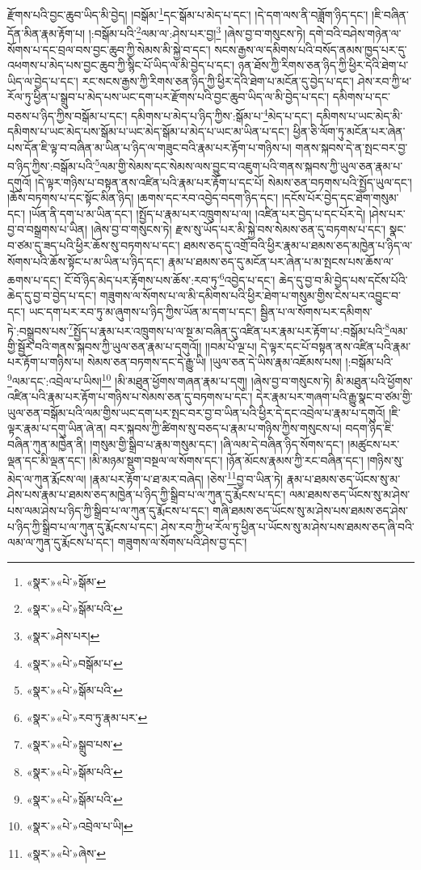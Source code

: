 རྫོགས་པའི་བྱང་ཆུབ་ཡིད་མི་བྱེད། །བསྒོམ་\footnote{«སྣར་»«པེ་»སྒོམ་}དང་སྒོམ་པ་མེད་པ་དང་། །དེ་དག་ལས་ནི་བཟློག་ཉིད་དང་། །ཇི་བཞིན་དོན་མིན་རྣམ་རྟོག་པ། །:བསྒོམ་པའི་\footnote{«སྣར་»«པེ་»སྒོམ་པའི་}ལམ་ལ་:ཤེས་པར་བྱ།\footnote{«སྣར་»ཤེས་པར།} །ཞེས་བྱ་བ་གསུངས་ཏེ། དགེ་བའི་བཤེས་གཉེན་ལ་སོགས་པ་དང་བྲལ་བས་བྱང་ཆུབ་ཀྱི་སེམས་མི་སྐྱེ་བ་དང་། སངས་རྒྱས་ལ་དམིགས་པའི་བསོད་ནམས་ཁྱད་པར་དུ་འཕགས་པ་མེད་པས་བྱང་ཆུབ་ཀྱི་སྙིང་པོ་ཡིད་ལ་མི་བྱེད་པ་དང་། ཉན་ཐོས་ཀྱི་རིགས་ཅན་ཉིད་ཀྱི་ཕྱིར་དེའི་ཐེག་པ་ཡིད་ལ་བྱེད་པ་དང་། རང་སངས་རྒྱས་ཀྱི་རིགས་ཅན་ཉིད་ཀྱི་ཕྱིར་དེའི་ཐེག་པ་མངོན་དུ་བྱེད་པ་དང་། ཤེས་རབ་ཀྱི་ཕ་རོལ་ཏུ་ཕྱིན་པ་སྒྲུབ་པ་མེད་པས་ཡང་དག་པར་རྫོགས་པའི་བྱང་ཆུབ་ཡིད་ལ་མི་བྱེད་པ་དང་། དམིགས་པ་དང་བཅས་པ་ཉིད་ཀྱིས་བསྒོམ་པ་དང་། དམིགས་པ་མེད་པ་ཉིད་ཀྱིས་:སྒོམ་པ་\footnote{«སྣར་»«པེ་»བསྒོམ་པ་}མེད་པ་དང་། དམིགས་པ་ཡང་མེད་མི་དམིགས་པ་ཡང་མེད་པས་སྒོམ་པ་ཡང་མེད་སྒོམ་པ་མེད་པ་ཡང་མ་ཡིན་པ་དང་། ཕྱིན་ཅི་ལོག་ཏུ་མངོན་པར་ཞེན་པས་དོན་ཇི་ལྟ་བ་བཞིན་མ་ཡིན་པ་ཉིད་ལ་གཟུང་བའི་རྣམ་པར་རྟོག་པ་གཉིས་པ། གནས་སྐབས་དེ་ན་སྤང་བར་བྱ་བ་ཉིད་ཀྱིས་:བསྒོམ་པའི་\footnote{«སྣར་»«པེ་»སྒོམ་པའི་}ལམ་གྱི་སེམས་དང་སེམས་ལས་བྱུང་བ་འཇུག་པའི་གནས་སྐབས་ཀྱི་ཡུལ་ཅན་རྣམ་པ་དགུའོ། །དེ་ལྟར་གཉིས་པ་བསྟན་ནས་འཛིན་པའི་རྣམ་པར་རྟོག་པ་དང་པོ། སེམས་ཅན་བཏགས་པའི་སྤྱོད་ཡུལ་དང་། །ཆོས་བཏགས་པ་དང་སྟོང་མིན་ཉིད། །ཆགས་དང་རབ་འབྱེད་བདག་ཉིད་དང་། །དངོས་པོར་བྱེད་དང་ཐེག་གསུམ་དང་། །ཡོན་ནི་དག་པ་མ་ཡིན་དང་། །སྤྱོད་པ་རྣམ་པར་འཁྲུགས་པ་ལ། །འཛིན་པར་བྱེད་པ་དང་པོར་དེ། །ཤེས་པར་བྱ་བ་བསྒྲགས་པ་ཡིན། །ཞེས་བྱ་བ་གསུངས་ཏེ། རྫས་སུ་ཡོད་པར་མི་སྐྱེ་བས་སེམས་ཅན་དུ་བཏགས་པ་དང་། སྣང་བ་ཙམ་དུ་ཟད་པའི་ཕྱིར་ཆོས་སུ་བཏགས་པ་དང་། ཐམས་ཅད་དུ་འགྲོ་བའི་ཕྱིར་རྣམ་པ་ཐམས་ཅད་མཁྱེན་པ་ཉིད་ལ་སོགས་པའི་ཆོས་སྟོང་པ་མ་ཡིན་པ་ཉིད་དང་། རྣམ་པ་ཐམས་ཅད་དུ་མངོན་པར་ཞེན་པ་མ་སྤངས་པས་ཆོས་ལ་ཆགས་པ་དང་། ངོ་བོ་ཉིད་མེད་པར་རྟོགས་པས་ཆོས་:རབ་ཏུ་\footnote{«སྣར་»«པེ་»རབ་ཏུ་རྣམ་པར་}འབྱེད་པ་དང་། ཆེད་དུ་བྱ་བ་མི་བྱེད་པས་དངོས་པོའི་ཆེད་དུ་བྱ་བ་བྱེད་པ་དང་། གཟུགས་ལ་སོགས་པ་ལ་མི་དམིགས་པའི་ཕྱིར་ཐེག་པ་གསུམ་གྱིས་ངེས་པར་འབྱུང་བ་དང་། ཡང་དག་པར་རབ་ཏུ་མ་ཞུགས་པ་ཉིད་ཀྱིས་ཡོན་མ་དག་པ་དང་། སྦྱིན་པ་ལ་སོགས་པར་དམིགས་ཏེ་:བསྒྲུབས་པས་\footnote{«སྣར་»«པེ་»སྒྲུབ་པས་}སྤྱོད་པ་རྣམ་པར་འཁྲུགས་པ་ལ་སྔ་མ་བཞིན་དུ་འཛིན་པར་རྣམ་པར་རྟོག་པ་:བསྒོམ་པའི་\footnote{«སྣར་»«པེ་»སྒོམ་པའི་}ལམ་གྱི་སྦྱོར་བའི་གནས་སྐབས་ཀྱི་ཡུལ་ཅན་རྣམ་པ་དགུའོ།། །།བམ་པོ་ལྔ་པ། དེ་ལྟར་དང་པོ་བསྟན་ནས་འཛིན་པའི་རྣམ་པར་རྟོག་པ་གཉིས་པ། སེམས་ཅན་བཏགས་དང་དེ་རྒྱུ་ཡི། །ཡུལ་ཅན་དེ་ཡིས་རྣམ་འཇོམས་པས། །:བསྒོམ་པའི་\footnote{«སྣར་»«པེ་»སྒོམ་པའི་}ལམ་དང་:འབྲེལ་པ་ཡིས།\footnote{«སྣར་»«པེ་»འབྲེལ་པ་ཡི།} །མི་མཐུན་ཕྱོགས་གཞན་རྣམ་པ་དགུ། །ཞེས་བྱ་བ་གསུངས་ཏེ། མི་མཐུན་པའི་ཕྱོགས་འཛིན་པའི་རྣམ་པར་རྟོག་པ་གཉིས་པ་སེམས་ཅན་དུ་བཏགས་པ་དང་། དེར་རྣམ་པར་གཞག་པའི་རྒྱུ་སྣང་བ་ཙམ་གྱི་ཡུལ་ཅན་བསྒོམ་པའི་ལམ་གྱིས་ཡང་དག་པར་སྤང་བར་བྱ་བ་ཡིན་པའི་ཕྱིར་དེ་དང་འབྲེལ་པ་རྣམ་པ་དགུའོ། །ཇི་ལྟར་རྣམ་པ་དགུ་ཡིན་ཞེ་ན། བར་སྐབས་ཀྱི་ཚིགས་སུ་བཅད་པ་རྣམ་པ་གཉིས་ཀྱིས་གསུངས་པ། བདག་ཉིད་ཇི་བཞིན་ཀུན་མཁྱེན་ནི། །གསུམ་གྱི་སྒྲིབ་པ་རྣམ་གསུམ་དང་། །ཞི་ལམ་དེ་བཞིན་ཉིད་སོགས་དང་། །མཚུངས་པར་ལྡན་དང་མི་ལྡན་དང་། །མི་མཉམ་སྡུག་བསྔལ་ལ་སོགས་དང་། །ཉོན་མོངས་རྣམས་ཀྱི་རང་བཞིན་དང་། །གཉིས་སུ་མེད་ལ་ཀུན་རྨོངས་ལ། །རྣམ་པར་རྟོག་པ་ཐ་མར་བཞེད། །ཅེས་\footnote{«སྣར་»«པེ་»ཞེས་}བྱ་བ་ཡིན་ཏེ། རྣམ་པ་ཐམས་ཅད་ཡོངས་སུ་མ་ཤེས་པས་རྣམ་པ་ཐམས་ཅད་མཁྱེན་པ་ཉིད་ཀྱི་སྒྲིབ་པ་ལ་ཀུན་དུ་རྨོངས་པ་དང་། ལམ་ཐམས་ཅད་ཡོངས་སུ་མ་ཤེས་པས་ལམ་ཤེས་པ་ཉིད་ཀྱི་སྒྲིབ་པ་ལ་ཀུན་དུ་རྨོངས་པ་དང་། གཞི་ཐམས་ཅད་ཡོངས་སུ་མ་ཤེས་པས་ཐམས་ཅད་ཤེས་པ་ཉིད་ཀྱི་སྒྲིབ་པ་ལ་ཀུན་དུ་རྨོངས་པ་དང་། ཤེས་རབ་ཀྱི་ཕ་རོལ་ཏུ་ཕྱིན་པ་ཡོངས་སུ་མ་ཤེས་པས་ཐམས་ཅད་ཞི་བའི་ལམ་ལ་ཀུན་དུ་རྨོངས་པ་དང་། གཟུགས་ལ་སོགས་པའི་ཤེས་བྱ་དང་། 